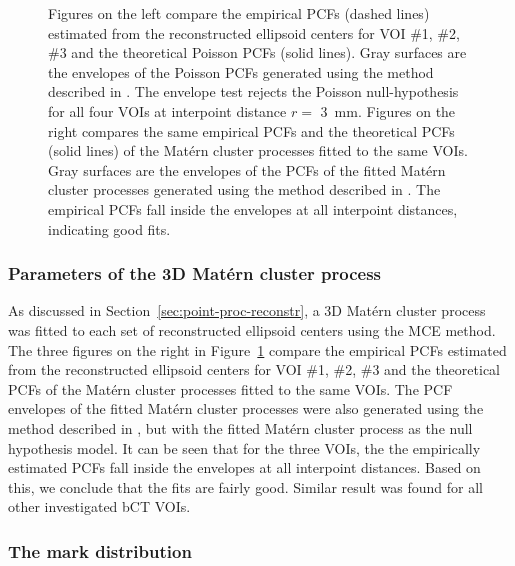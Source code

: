 \documentclass[journal]{IEEEtran}
\begin{document}
\begin{figure}[!htb]
  \caption{Figures on the left compare the empirical PCFs (dashed
    lines) estimated from the reconstructed ellipsoid centers for VOI
    \#1, \#2, \#3 and the theoretical Poisson PCFs (solid lines). Gray
    surfaces are the envelopes of the Poisson PCFs generated using the
    method described in \cite{baddeley2014tests}. The envelope test
    rejects the Poisson null-hypothesis for all four VOIs at
    interpoint distance $r = $ \SI{3}{\mm}. Figures on the right
    compares the same empirical PCFs and the theoretical PCFs (solid
    lines) of the Mat\'ern cluster processes fitted to the same
    VOIs. Gray surfaces are the envelopes of the PCFs of the fitted
    Mat\'ern cluster processes generated using the method described in
    \cite{baddeley2014tests}. The empirical PCFs fall inside the
    envelopes at all interpoint distances, indicating good fits.}
  \label{fig:pcf-est}

\end{figure}

\subsubsection{Parameters of the 3D Mat\'ern cluster process}
\label{sec:parameters-3d-matern}

As discussed in Section~\ref{sec:point-proc-reconstr}, a 3D Mat\'ern
cluster process was fitted to each set of reconstructed ellipsoid
centers using the MCE method. The three figures on the right in
Figure~\ref{fig:pcf-est} compare the empirical PCFs estimated from the
reconstructed ellipsoid centers for VOI \#1, \#2, \#3 and the
theoretical PCFs of the Mat\'ern cluster processes fitted to the same
VOIs. The PCF envelopes of the fitted Mat\'ern cluster processes were
also generated using the method described in \cite{baddeley2014tests},
but with the fitted Mat\'ern cluster process as the null hypothesis
model. It can be seen that for the three VOIs, the the empirically
estimated PCFs fall inside the envelopes at all interpoint
distances. Based on this, we conclude that the fits are fairly
good. Similar result was found for all other investigated bCT VOIs.

\subsubsection{The mark distribution}
\label{sec:mark-distribution-1}
\end{document}
